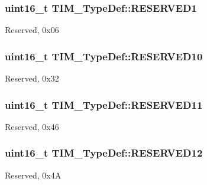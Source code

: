 \subsubsection[{\texorpdfstring{R\+E\+S\+E\+R\+V\+E\+D1}{RESERVED1}}]{\setlength{\rightskip}{0pt plus 5cm}uint16\+\_\+t T\+I\+M\+\_\+\+Type\+Def\+::\+R\+E\+S\+E\+R\+V\+E\+D1}\hypertarget{struct_t_i_m___type_def_a59c46ac3a56c6966a7f8f379a2fd1e3e}{}\label{struct_t_i_m___type_def_a59c46ac3a56c6966a7f8f379a2fd1e3e}
Reserved, 0x06 
\subsubsection[{\texorpdfstring{R\+E\+S\+E\+R\+V\+E\+D10}{RESERVED10}}]{\setlength{\rightskip}{0pt plus 5cm}uint16\+\_\+t T\+I\+M\+\_\+\+Type\+Def\+::\+R\+E\+S\+E\+R\+V\+E\+D10}\hypertarget{struct_t_i_m___type_def_ab0e228ff39a37b472aa48ba3afd18333}{}\label{struct_t_i_m___type_def_ab0e228ff39a37b472aa48ba3afd18333}
Reserved, 0x32 
\subsubsection[{\texorpdfstring{R\+E\+S\+E\+R\+V\+E\+D11}{RESERVED11}}]{\setlength{\rightskip}{0pt plus 5cm}uint16\+\_\+t T\+I\+M\+\_\+\+Type\+Def\+::\+R\+E\+S\+E\+R\+V\+E\+D11}\hypertarget{struct_t_i_m___type_def_a7a96436f300141eb48768ffa90ee6e71}{}\label{struct_t_i_m___type_def_a7a96436f300141eb48768ffa90ee6e71}
Reserved, 0x46 
\subsubsection[{\texorpdfstring{R\+E\+S\+E\+R\+V\+E\+D12}{RESERVED12}}]{\setlength{\rightskip}{0pt plus 5cm}uint16\+\_\+t T\+I\+M\+\_\+\+Type\+Def\+::\+R\+E\+S\+E\+R\+V\+E\+D12}\hypertarget{struct_t_i_m___type_def_a994061b8b26ae9b2e8ddb981cb3eec11}{}\label{struct_t_i_m___type_def_a994061b8b26ae9b2e8ddb981cb3eec11}
Reserved, 0x4A 
